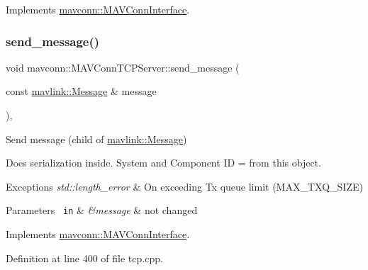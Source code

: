 Implements \mbox{\hyperlink{group__mavconn_gad807cf7e1935548e0c7ba94943cbb7aa}{mavconn\+::\+M\+A\+V\+Conn\+Interface}}.

\mbox{\label{group__mavconn_ga8e3d7a81031fe54f3326f2ea4ccfa2ef}} 
\subsubsection{\texorpdfstring{send\_message()}{send\_message()}\hspace{0.1cm}{\footnotesize\ttfamily [8/10]}}
{\footnotesize\ttfamily void mavconn\+::\+M\+A\+V\+Conn\+T\+C\+P\+Server\+::send\+\_\+message (\begin{DoxyParamCaption}\item[{const \mbox{\hyperlink{structmavlink_1_1Message}{mavlink\+::\+Message}} \&}]{message }\end{DoxyParamCaption})\hspace{0.3cm}{\ttfamily [override]}, {\ttfamily [virtual]}}



Send message (child of \mbox{\hyperlink{structmavlink_1_1Message}{mavlink\+::\+Message}}) 

Does serialization inside. System and Component ID = from this object.


\begin{DoxyExceptions}{Exceptions}
{\em std\+::length\+\_\+error} & On exceeding Tx queue limit (M\+A\+X\+\_\+\+T\+X\+Q\+\_\+\+S\+I\+ZE) \\
\hline
\end{DoxyExceptions}

\begin{DoxyParams}[1]{Parameters}
\mbox{\texttt{ in}}  & {\em \&message} & not changed \\
\hline
\end{DoxyParams}


Implements \mbox{\hyperlink{group__mavconn_ga204ee5ba0dc31519b0ea7a9ac50d486c}{mavconn\+::\+M\+A\+V\+Conn\+Interface}}.



Definition at line 400 of file tcp.\+cpp.

\mbox{\label{group__mavconn_gad807cf7e1935548e0c7ba94943cbb7aa}} 
